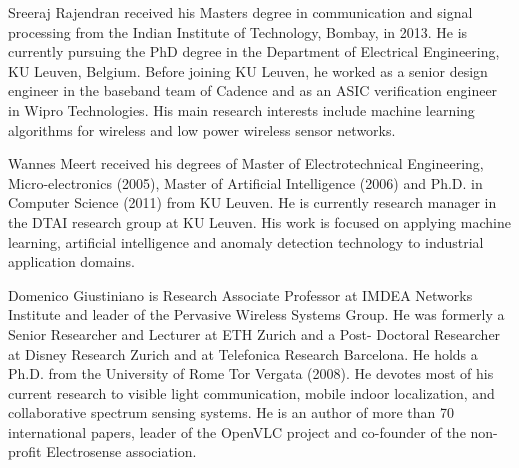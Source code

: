 \begin{IEEEbiography}
    {Sreeraj Rajendran}
received his Masters degree in communication and signal processing from the Indian Institute of Technology, Bombay, in 2013. He is currently pursuing the PhD degree in the Department of Electrical Engineering, KU Leuven, Belgium. Before joining KU Leuven, he worked as a senior design engineer in the baseband team of Cadence and as an ASIC verification engineer in Wipro Technologies. His main research interests include machine learning algorithms for wireless and low power wireless sensor networks.
\end{IEEEbiography}

\begin{IEEEbiography}
    {Wannes Meert}
received his degrees of Master of Electrotechnical Engineering, Micro-electronics (2005), Master of Artificial Intelligence (2006) and Ph.D. in Computer Science (2011) from KU Leuven. He is currently research manager in the DTAI research group at KU Leuven. His work is focused on applying machine learning, artificial intelligence and anomaly detection technology to industrial application domains.
\end{IEEEbiography}

\begin{IEEEbiography}
    {Domenico Giustiniano}
is Research Associate Professor at IMDEA Networks Institute and leader of the Pervasive Wireless Systems Group. He was formerly a Senior Researcher and Lecturer at ETH Zurich and a Post-
Doctoral Researcher at Disney Research Zurich and at Telefonica Research Barcelona. He holds a Ph.D. from the University of Rome Tor Vergata (2008). He devotes most of his current research to visible light communication, mobile indoor localization, and collaborative spectrum sensing systems. He is an author of more than 70 international papers, leader of the OpenVLC project
and co-founder of the non-profit Electrosense association.
\end{IEEEbiography}

